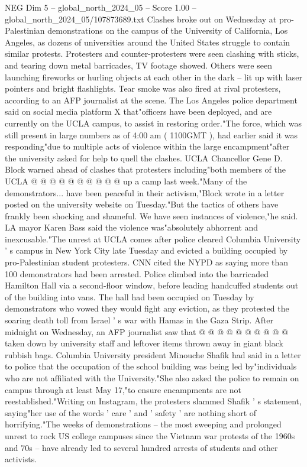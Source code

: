 \begin{textsample}{NEG Dim 5 – global\_north\_2024\_05 – Score 1.00 – global\_north\_2024\_05/107873689.txt}  \label{ex:f5_neg_288}
Clashes broke out on Wednesday at pro-Palestinian demonstrations on the campus of the University of California, Los Angeles, as dozens of universities around the United States struggle to contain similar protests.
Protesters and counter-protesters were seen clashing with sticks, and tearing down metal barricades, TV footage showed.
Others were seen launching fireworks or hurling objects at each other in the dark -- lit up with laser pointers and bright flashlights.
Tear smoke was also fired at rival protesters, according to an AFP journalist at the scene.
The Los Angeles police department said on social media platform X that"officers have been deployed, and are currently on the UCLA campus, to assist in restoring order."The force, which was still present in large numbers as of 4:00 am ( 1100GMT ), had earlier said it was responding"due to multiple acts of violence within the large encampment"after the university asked for help to quell the clashes.
UCLA Chancellor Gene D.
Block warned ahead of clashes that protesters including"both members of the UCLA @ @ @ @ @ @ @ @ @ @ up a camp last week."Many of the demonstrators... have been peaceful in their activism,"Block wrote in a letter posted on the university website on Tuesday."But the tactics of others have frankly been shocking and shameful.
We have seen instances of violence,"he said.
LA mayor Karen Bass said the violence was"absolutely abhorrent and inexcusable."The unrest at UCLA comes after police cleared Columbia University ' s campus in New York City late Tuesday and evicted a building occupied by pro-Palestinian student protesters.
CNN cited the NYPD as saying more than 100 demonstrators had been arrested.
Police climbed into the barricaded Hamilton Hall via a second-floor window, before leading handcuffed students out of the building into vans.
The hall had been occupied on Tuesday by demonstrators who vowed they would fight any eviction, as they protested the soaring death toll from Israel ' s war with Hamas in the Gaza Strip.
After midnight on Wednesday, an AFP journalist saw that @ @ @ @ @ @ @ @ @ @ taken down by university staff and leftover items thrown away in giant black rubbish bags.
Columbia University president Minouche Shafik had said in a letter to police that the occupation of the school building was being led by"individuals who are not affiliated with the University."She also asked the police to remain on campus through at least May 17,"to ensure encampments are not reestablished."Writing on Instagram, the protesters slammed Shafik ' s statement, saying"her use of the words ' care ' and ' safety ' are nothing short of horrifying."The weeks of demonstrations -- the most sweeping and prolonged unrest to rock US college campuses since the Vietnam war protests of the 1960s and 70s -- have already led to several hundred arrests of students and other activists.

\end{textsample}
